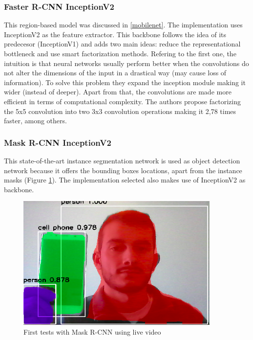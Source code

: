 \subsubsection{Faster R-CNN InceptionV2}
This region-based model was discussed in \ref{mobilenet}. The implementation uses InceptionV2 \cite{szegedy2016rethinking} as the feature extractor. This backbone follows the idea of its predecesor (InceptionV1) and adds two main ideas: reduce the representational bottleneck and use smart factorization methods. Refering to the first one, the intuition is that neural networks usually perform better when the convolutions do not alter the dimensions of the input in a drastical way (may cause loss of information). To solve this problem they expand the inception module making it wider (instead of deeper). Apart from that, the convolutions are made more efficient in terms of computational complexity. The authors propose factorizing the 5x5 convolution into two 3x3 convolution operations making it 2,78 times faster, among others.
\subsubsection{Mask R-CNN InceptionV2}
This state-of-the-art instance segmentation network is used as object detection network because it offers the bounding boxes locations, apart from the instance masks (Figure \ref{fig:maskrcnn_tests}). The implementation selected also makes use of InceptionV2 as backbone.
\begin{figure}[H]
\begin{center}
\includegraphics[scale=0.5]{figures/maskrcnn_first_tests.png}
\caption{First tests with Mask R-CNN using live video}
\label{fig:maskrcnn_tests}
\end{center}
\end{figure} 

